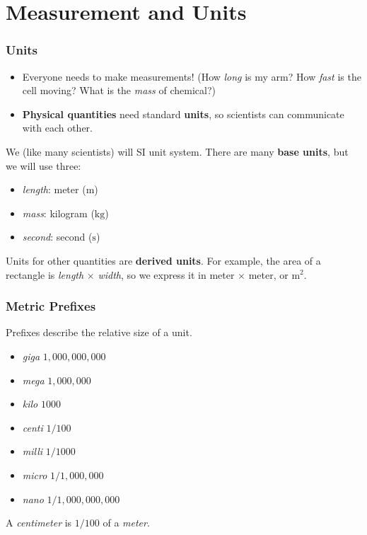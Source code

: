 \documentclass[20pt]{beamer}
\begin{document}
\section{Measurement and Units}
\begin{frame}
	\frametitle{Units}
	\begin{itemize}
		\item Everyone needs to make measurements! (How \textit{long} is my arm? How \textit{fast} is the cell moving? What is the \textit{mass} of chemical?)
		\item \textbf{Physical quantities} need standard \textbf{units}, so scientists can communicate with each other.
	\end{itemize}
	\begin{definition}
		We (like many scientists) will SI unit system. There are many \textbf{base units}, but we will use three:
		\begin{itemize}
			\item \textit{length}: meter ($\mathrm{m}$)
			\item \textit{mass}: kilogram ($\mathrm{kg}$)
			\item \textit{second}: second ($\mathrm{s}$)
		\end{itemize}
		Units for other quantities are \textbf{derived units}. For example, the area of a rectangle is \textit{length} $\times$ \textit{width}, so we express it in meter $\times$ meter, or $\mathrm{m}^2$.
	\end{definition}
\end{frame}

\begin{frame}
	\frametitle{Metric Prefixes}
	Prefixes describe the relative size of a unit.
	\begin{itemize}
		\item \textit{giga} $1,000,000,000$
		\item \textit{mega} $1,000,000$
		\item \textit{kilo} $1000$
		\item \textit{centi} $1/100$
		\item \textit{milli} $1/1000$
		\item \textit{micro} $1/1,000,000$
		\item \textit{nano} $1/1,000,000,000$
	\end{itemize}
	\begin{example}
		A \textit{centimeter} is $1/100$ of a \textit{meter}.
	\end{example}
\end{frame}
\end{document}
